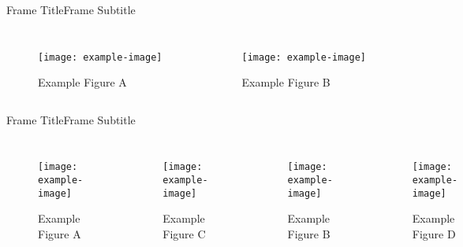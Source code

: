 \begin{frame}{Frame Title}{Frame Subtitle}
    \begin{columns}
        \begin{figure}
            \begin{center}
                \texttt{[image: example-image]}
                \caption{Example Figure A}
            \end{center}
        \end{figure}
        \begin{figure}
            \begin{center}
                \texttt{[image: example-image]}
                \caption{Example Figure B}
            \end{center}
        \end{figure}
    \end{columns}
\end{frame}

\begin{frame}{Frame Title}{Frame Subtitle}
    \begin{columns}
        \begin{figure}
            \begin{center}
                \texttt{[image: example-image]}
                \caption{Example Figure A}
            \end{center}
        \end{figure}
        \begin{figure}
            \begin{center}
                \texttt{[image: example-image]}
                \caption{Example Figure C}
            \end{center}
        \end{figure}
        \begin{figure}
            \begin{center}
                \texttt{[image: example-image]}
                \caption{Example Figure B}
            \end{center}
        \end{figure}
        \begin{figure}
            \begin{center}
                \texttt{[image: example-image]}
                \caption{Example Figure D}
            \end{center}
        \end{figure}
    \end{columns}
\end{frame}
